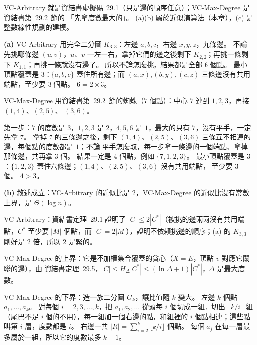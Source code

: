 \begin{pastsoln}
VC-Arbitrary 就是資結書虛擬碼~29.1（只是邊的順序任意）；VC-Max-Degree 是資結書第~29.2~節的
「先拿度數最大的」。 (a)(b) 屬於近似演算法（本章），(c) 是整數線性規劃的建模。

\textbf{(a)} VC-Arbitrary 用完全二分圖 $K_{3,3}$：左邊 $a, b, c$，右邊 $x, y, z$，九條邊。 不論先挑哪條邊
$(u, v)$，$u$、$v$ 一左一右，拿掉它們的邊之後剩下 $K_{2,2}$；再挑一條剩下 $K_{1,1}$；再挑一條就沒有邊了。
所以不論怎麼挑，結果都是全部 $6$ 個點。 最小頂點覆蓋是 $3$：$\{a, b, c\}$ 蓋住所有邊；而
$(a, x), (b, y), (c, z)$ 三條邊沒有共用端點，至少要 $3$ 個點。 $6 = 2 \times 3$。

VC-Max-Degree 用資結書第~29.2~節的蜘蛛（$7$ 個點）：中心 $7$ 連到 $1, 2, 3$，再接 $(1,4)$、$(2,5)$、
$(3,6)$。
\begin{center}
\end{center}
第一步：$7$ 的度數是 $3$，$1, 2, 3$ 是 $2$，$4, 5, 6$ 是 $1$，最大的只有 $7$，沒有平手，一定先拿
$7$。 拿掉 $7$ 的三條邊之後，剩下 $(1,4)$、$(2,5)$、$(3,6)$ 三條互不相連的邊，每個點的度數都是 $1$；不論
平手怎麼取，每一步拿一條邊的一個端點、拿掉那條邊，共再拿 $3$ 個。 結果一定是 $4$ 個點，例如
$\{7, 1, 2, 3\}$。 最小頂點覆蓋是 $3$：$\{1, 2, 3\}$ 蓋住六條邊；$(1,4)$、$(2,5)$、$(3,6)$ 沒有共用端點，
至少要 $3$ 個。 $4 > 3$。

\textbf{(b)} 敘述成立：VC-Arbitrary 的近似比是 $2$，VC-Max-Degree 的近似比沒有常數上界，是
$\Theta(\log n)$。

VC-Arbitrary：資結書定理~29.1 證明了 $|C| \le 2|C^*|$（被挑的邊兩兩沒有共用端點，$C^*$ 至少要
$|M|$ 個點，而 $|C| = 2|M|$），證明不依賴挑邊的順序；(a) 的 $K_{3,3}$ 剛好是 $2$ 倍，所以 $2$ 是緊的。

VC-Max-Degree 的上界：它是不加權集合覆蓋的貪心（$X = E$，頂點 $v$ 對應它關聯的邊），由
資結書定理~29.5，$|C| \le H_\Delta |C^*| \le (\ln \Delta + 1)|C^*|$，$\Delta$ 是最大度數。

VC-Max-Degree 的下界：造一族二分圖 $G_k$，讓比值隨 $k$ 變大。 左邊 $k$ 個點 $a_1, \ldots, a_k$。 對每個
$i = 2, 3, \ldots, k$，把 $a_1, a_2, \ldots$ 從頭每 $i$ 個切成一組，切出 $\lfloor k/i \rfloor$ 組（尾巴不足
$i$ 個的不用），每一組加一個右邊的點，和組裡的 $i$ 個點相連；這些點叫第 $i$ 層，度數都是 $i$。 右邊一共
$|R| = \sum_{i=2}^{k} \lfloor k/i \rfloor$ 個點。 每個 $a_j$ 在每一層最多屬於一組，所以它的度數最多
$k - 1$。


\end{pastsoln}
